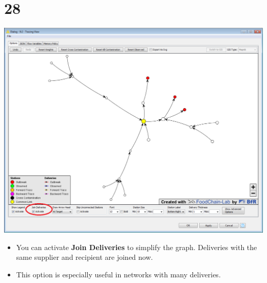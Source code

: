 \documentclass[10pt]{beamer}
\begin{document}
\section{28}
\begin{frame}
	\begin{center}
  		\includegraphics[height=0.6\textheight]{28.png}
	\end{center}
	\begin{itemize}
		\item You can activate \textbf{Join Deliveries} to simplify the graph. Deliveries with the same supplier and recipient are joined now.
		\item This option is especially useful in networks with many deliveries.
	\end{itemize}
\end{frame}
\end{document}
